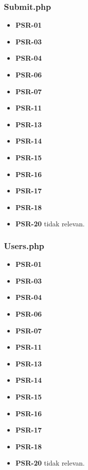 \subsubsection{Submit.php}
\begin{itemize}
	\item \textbf{PSR-01} 
	\item \textbf{PSR-03}
	\item \textbf{PSR-04}
	\item \textbf{PSR-06}
	\item \textbf{PSR-07}
	\item \textbf{PSR-11}
	\item \textbf{PSR-13}
	\item \textbf{PSR-14}
	\item \textbf{PSR-15}
	\item \textbf{PSR-16}
	\item \textbf{PSR-17} 
	\item \textbf{PSR-18} 
	\item \textbf{PSR-20} tidak relevan.
\end{itemize}

\subsubsection{Users.php}
\begin{itemize}
	\item \textbf{PSR-01} 
	\item \textbf{PSR-03}
	\item \textbf{PSR-04}
	\item \textbf{PSR-06}
	\item \textbf{PSR-07}
	\item \textbf{PSR-11}
	\item \textbf{PSR-13}
	\item \textbf{PSR-14}
	\item \textbf{PSR-15}
	\item \textbf{PSR-16}
	\item \textbf{PSR-17} 
	\item \textbf{PSR-18} 
	\item \textbf{PSR-20} tidak relevan.
\end{itemize}

